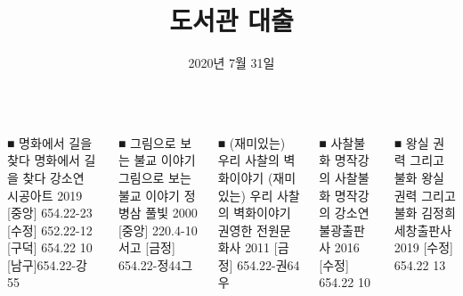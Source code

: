 \documentclass[	20pt, 
							a1paper, 
							landscape, %
							margin=0mm, %
							innermargin=10mm,  		%
							blockverticalspace=4mm, %
							colspace=5mm, 
							subcolspace=0mm
							]{tikzposter}
\title{도서관 대출 }
\author{ 2020년 
				7월
				31일  }
\begin{document}
	\maketitle

	\begin{columns}





			\block 
			{■  명화에서 길을 찾다 }
			{				
			명화에서 길을 찾다 강소연 시공아트 2019
			[중앙] 654.22-23
			[수정] 652.22-12
			[구덕] 654.22 10
			[남구]654.22-강55
			}


			\block 
			{■  그림으로 보는 불교 이야기 }
			{				
			그림으로 보는 불교 이야기 정병삼 풀빛 2000
			[중앙] 220.4-10 서고
			[금정] 654.22-정44그
			}

			\block
			{■  (재미있는) 우리 사찰의 벽화이야기 }
			{				
			(재미있는) 우리 사찰의 벽화이야기 권영한 전원문화사 2011
			[금정] 654.22-권64우
			}

			\block
			{■  사찰불화 명작강의 }
			{				
			사찰불화 명작강의 강소연 불광출판사 2016 
			[수정] 654.22 10
			}

			\block
			{■  왕실 권력 그리고 불화 }
			{				
			왕실 권력 그리고 불화  김정희 세창출판사 2019
			[수정] 654.22 13
			}






\end{columns}
\end{document}
